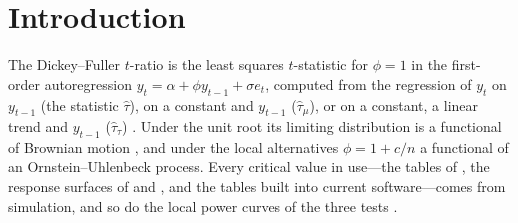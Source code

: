 \documentclass[ecta,nameyear,final]{econsocart}
\theoremstyle{plain}
\theoremstyle{definition}
\begin{document}
\section{Introduction}
\label{sec:intro}

The Dickey--Fuller $t$-ratio is the least squares $t$-statistic for $\phi=1$ in the first-order autoregression $y_t=\alpha+\phi y_{t-1}+\sigma e_t$, computed from the regression of $y_t$ on $y_{t-1}$ (the statistic $\hat\tau$), on a constant and $y_{t-1}$ ($\hat\tau_\mu$), or on a constant, a linear trend and $y_{t-1}$ ($\hat\tau_\tau$) \citep{DickeyFuller1979,DickeyFuller1981,Fuller1996}.  Under the unit root its limiting distribution is a functional of Brownian motion \citep{DickeyFuller1979,ChanWei1987,Phillips1987}, and under the local alternatives $\phi=1+c/n$ a functional of an Ornstein--Uhlenbeck process.  Every critical value in use---the tables of \cite{Fuller1996}, the response surfaces of \cite{MacKinnon1996,MacKinnon2010} and \cite{CheungLai1995}, and the tables built into current software---comes from simulation, and so do the local power curves of the three tests \citep{Elliott1999,MullerElliott2003,HarveyLeybourneTaylor2009}.
\end{document}
